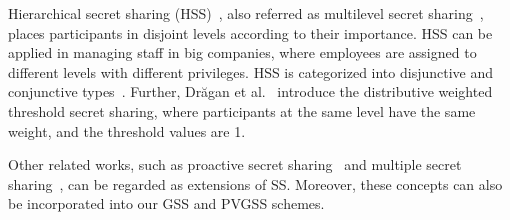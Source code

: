 \documentclass[runningheads]{llncs}
\begin{document}


Hierarchical secret sharing (HSS)~\cite{tassa2007hierarchical,Chattopadhyay2024SS}, also referred as multilevel secret sharing~\cite{Simmons1988SS,tassa2007hierarchical}, places participants in disjoint levels according to their importance. HSS can be applied in managing staff in big companies, where employees are assigned to different levels with different privileges.
HSS is categorized into disjunctive and conjunctive types~\cite{Drăgan2016DWSS}. Further, Drăgan et al.~\cite{Drăgan2016DWSS} introduce the distributive weighted threshold secret sharing, where participants at the same level have the same weight, and the threshold values are 1.

Other related works, such as proactive secret sharing~\cite{Bagherpour2022VPSS} and multiple secret sharing~\cite{Lin2018PVMSS}, can be regarded as extensions of SS. Moreover, these concepts can also be incorporated into our GSS and PVGSS schemes.






\end{document}
